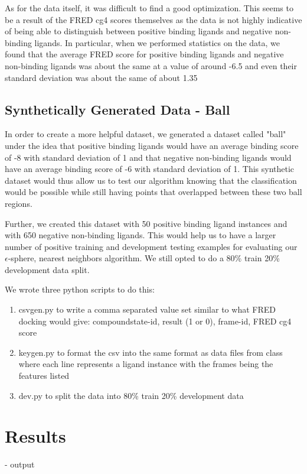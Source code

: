 \documentclass[11pt,letterpaper]{article}
\begin{document}
As for the data itself, it was difficult to find a good optimization.  This seems to be a result of the FRED cg4 scores themselves as the data is not highly indicative of being able to distinguish between positive binding ligands and negative non-binding ligands.  In particular, when we performed statistics on the data, we found that the average FRED score for positive binding ligands and negative non-binding ligands was about the same at a value of around -6.5 and even their standard deviation was about the same of about 1.35

\subsection{Synthetically Generated Data - Ball}
In order to create a more helpful dataset, we generated a dataset called "ball" under the idea that positive binding ligands would have an average binding score of -8 with standard deviation of 1 and that negative non-binding ligands would have an average binding score of -6 with standard deviation of 1.  This synthetic dataset would thus allow us to test our algorithm knowing that the classification would be possible while still having points that overlapped between these two ball regions.

Further, we created this dataset with 50 positive binding ligand instances and with 650 negative non-binding ligands.  This would help us to have a larger number of positive training and development testing examples for evaluating our $\epsilon$-sphere, nearest neighbors algorithm.  We still opted to do a 80\% train 20\% development data split.

We wrote three python scripts to do this: 

\begin{enumerate} 	
	\item csvgen.py to write a comma separated value set similar to what FRED docking would give: compoundstate-id, result (1 or 0), frame-id, FRED cg4 score
	\item keygen.py to format the csv into the same format as data files from class where each line represents a ligand instance with the frames being the features listed
	\item dev.py to split the data into 80\% train 20\% development data
\end{enumerate}

\section{Results}
- output
\end{document}
